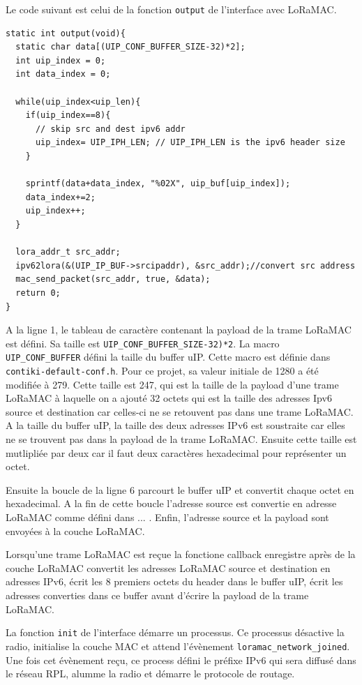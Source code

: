     Le code suivant est celui de la fonction \texttt{output} de l'interface avec LoRaMAC.

    \begin{verbatim}
static int output(void){ 
  static char data[(UIP_CONF_BUFFER_SIZE-32)*2];
  int uip_index = 0;
  int data_index = 0;
  
  while(uip_index<uip_len){
    if(uip_index==8){
      // skip src and dest ipv6 addr
      uip_index= UIP_IPH_LEN; // UIP_IPH_LEN is the ipv6 header size
    }

    sprintf(data+data_index, "%02X", uip_buf[uip_index]);
    data_index+=2;
    uip_index++;
  }

  lora_addr_t src_addr;
  ipv62lora(&(UIP_IP_BUF->srcipaddr), &src_addr);//convert src address
  mac_send_packet(src_addr, true, &data);
  return 0;
}
    \end{verbatim}
    A la ligne 1, le tableau de caractère contenant la payload de la trame LoRaMAC est défini. Sa 
    taille est \texttt{UIP\_CONF\_BUFFER\_SIZE-32)*2}. La macro \texttt{UIP\_CONF\_BUFFER} défini 
    la taille du buffer uIP. Cette macro est définie dans \texttt{contiki-default-conf.h}. Pour ce 
    projet, sa valeur initiale de 1280 a été modifiée à 279. Cette taille est 247, qui est la 
    taille de la payload d'une trame LoRaMAC à laquelle on a ajouté 32 octets qui est la taille des 
    adresses Ipv6 source et destination car celles-ci ne se retouvent pas dans une trame LoRaMAC.
    A la taille du buffer uIP, la taille des deux adresses IPv6 est soustraite car elles ne se 
    trouvent pas dans la payload de la trame LoRaMAC. Ensuite cette taille est mutlipliée par deux 
    car il faut deux caractères hexadecimal pour représenter un octet.

    Ensuite la boucle de la ligne 6 parcourt le buffer uIP et convertit chaque octet en hexadecimal.
    A la fin de cette boucle l'adresse source est convertie en adresse LoRaMAC comme défini dans
    ... . Enfin, l'adresse source et la payload sont envoyées à la couche LoRaMAC.

    Lorsqu'une trame LoRaMAC est reçue la fonctione callback enregistre après de la couche LoRaMAC 
    convertit les adresses LoRaMAC source et destination en adresses IPv6, écrit les 8 premiers 
    octets du header dans le buffer uIP, écrit les adresses converties dans ce buffer avant 
    d'écrire la payload de la trame LoRaMAC.

    La fonction \texttt{init} de l'interface démarre un processus. Ce processus désactive la radio, 
    initialise la couche MAC et attend l'évènement \texttt{loramac\_network\_joined}. Une fois cet 
    évènement reçu, ce process défini le préfixe IPv6 qui sera diffusé dans le réseau RPL, alumme 
    la radio et démarre le protocole de routage.

